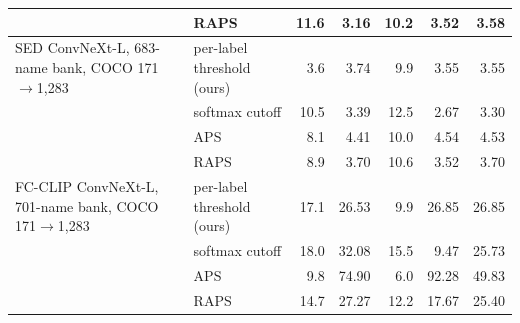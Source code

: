 \begin{tabular}{@{}llrrrrr@{}}
 & RAPS & 11.6 & 3.16 & 10.2 & 3.52 & 3.58 \\
\midrule
SED ConvNeXt-L, 683-name bank, COCO 171$\to$1,283 & per-label threshold (ours) & 3.6 & 3.74 & 9.9 & 3.55 & 3.55 \\
 & softmax cutoff & 10.5 & 3.39 & 12.5 & 2.67 & 3.30 \\
 & APS & 8.1 & 4.41 & 10.0 & 4.54 & 4.53 \\
 & RAPS & 8.9 & 3.70 & 10.6 & 3.52 & 3.70 \\
\midrule
FC-CLIP ConvNeXt-L, 701-name bank, COCO 171$\to$1,283 & per-label threshold (ours) & 17.1 & 26.53 & 9.9 & 26.85 & 26.85 \\
 & softmax cutoff & 18.0 & 32.08 & 15.5 & 9.47 & 25.73 \\
 & APS & 9.8 & 74.90 & 6.0 & 92.28 & 49.83 \\
 & RAPS & 14.7 & 27.27 & 12.2 & 17.67 & 25.40 \\
\bottomrule
\end{tabular}
